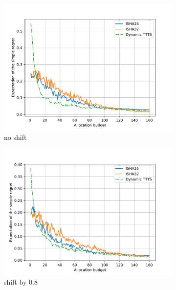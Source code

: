 \begin{figure}[ht]
  \centering
  \begin{subfigure}[t]{0.33\textwidth}
    \centering\includegraphics[width=\textwidth]{Chapter6/img/shift/no_shift_fix.pdf}
    \caption{no shift}
  \end{subfigure}%
  \begin{subfigure}[t]{0.33\textwidth}
    \centering\includegraphics[width=\textwidth]{Chapter6/img/shift/shift_-8_fix.pdf}
    \caption{shift by 0.8}
  \end{subfigure}
    \begin{subfigure}[t]{0.33\textwidth}

\end{subfigure}
\end{figure}
